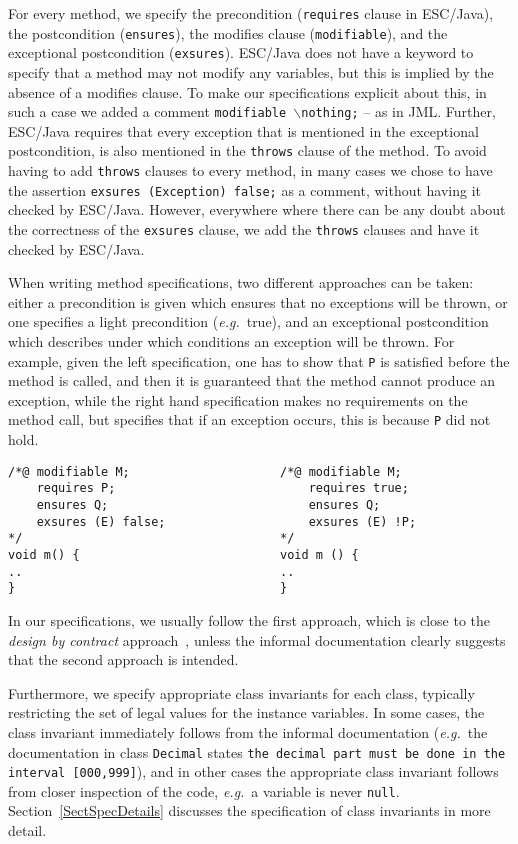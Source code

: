 \documentclass[a4paper]{llncs}
\newcommand{\noth}{\(\backslash\)\texttt{nothing}}
\begin{document}
For every method, we specify the precondition (\texttt{requires} clause
in ESC/Java), the postcondition (\texttt{ensures}), the modifies
clause (\texttt{modifiable}), and the exceptional postcondition
(\texttt{exsures}). ESC/Java does not have a keyword to specify that a
method may not modify any variables, but this is implied by the
absence of a modifies clause. To make our specifications explicit
about this, in such a case we added a comment
\texttt{modifiable \noth;} -- as in JML. Further, ESC/Java requires 
that every exception that is mentioned in the exceptional
postcondition, is also mentioned in the \texttt{throws} clause of the
method. To avoid having to add \texttt{throws} clauses to every method,
in many cases we chose to have the assertion \texttt{exsures
(Exception) false;} as a comment, without having it checked by
ESC/Java. However, everywhere where there can be any doubt about the
correctness of the \texttt{exsures} clause, we add the \texttt{throws}
clauses and have it checked by ESC/Java.

When writing method specifications, two different approaches can be
taken: either a precondition is given which ensures that no exceptions
will be thrown, or one specifies a light precondition
(\emph{e.g.}~true), and an exceptional postcondition which describes
under which conditions an exception will be thrown. For example, given
the left specification, one has to show that \texttt{P} is satisfied
before the method is called, and then it is guaranteed that the method
cannot produce an exception, while the right hand specification makes
no requirements on the method call, but specifies that if an exception
occurs, this is because \texttt{P} did not hold.
\begin{verbatim}
/*@ modifiable M;                     /*@ modifiable M;
    requires P;                           requires true;
    ensures Q;                            ensures Q;
    exsures (E) false;                    exsures (E) !P;
*/                                    */
void m() {                            void m () {
..                                    ..
}                                     }
\end{verbatim}

In our specifications, we usually follow the first approach, which
is close to the \emph{design by contract} approach~\cite{Meyer97},
unless the informal documentation clearly suggests that the second
approach is intended.

Furthermore, we specify appropriate class invariants for each class,
typically restricting the set of legal values for the instance
variables. In some cases, the class invariant immediately follows from
the informal documentation (\emph{e.g.}~the documentation in class
\texttt{Decimal} states
\texttt{the decimal part must be done in the interval [000,999]}), and
in other cases the appropriate class invariant follows from closer
inspection of the code, \emph{e.g.}~a variable is never \texttt{null}.
Section~\ref{SectSpecDetails} discusses the specification of class
invariants in more detail.
\end{document}
